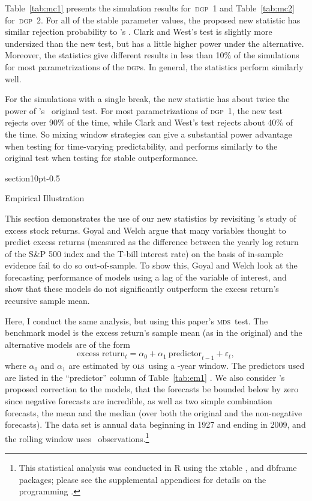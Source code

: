 \documentclass[11pt,fleqn]{article}
\makeatletter
\newcommand\citepos[2][]{\citeauthor{#2}'s \citeyearpar[#1]{#2}}
\newcommand\poscw{\citeauthor{ClW:06}'s \citeyearpar{ClW:06,ClW:07}}
\renewcommand\section{\@startsection%
{section}{1}{0pt}{-\baselineskip}{0.5\baselineskip}%
{\normalfont\normalsize\bfseries\large\raggedright}}
\theoremstyle{definition}
\newcommand{\dgp}{\textsc{dgp}}
\newcommand{\mds}{\textsc{mds}}
\newcommand{\ols}{\textsc{ols}}
\makeatother
\begin{document}
Table~\ref{tab:mc1} presents the simulation results for~\textsc{dgp}~1
and Table~\ref{tab:mc2} for~\textsc{dgp}~2.  For all of the stable
parameter values, the proposed new statistic has similar rejection
probability to \citepos{ClW:07}.  Clark and West's test is slightly
more undersized than the new test, but has a little higher power under
the alternative.  Moreover, the statistics give different results in
less than 10\% of the simulations for most parametrizations of the
\dgp s.  In general, the statistics perform similarly well.

For the simulations with a single break, the new statistic has about
twice the power of \poscw\ original test.  For most parametrizations
of \dgp\ 1, the new test rejects over 90\% of the time, while Clark
and West's test rejects about 40\% of the time.  So mixing window
strategies can give a substantial power advantage when testing for
time-varying predictability, and performs similarly to the original
test when testing for stable outperformance.

\section{Empirical Illustration}\label{sec:3}

This section demonstrates the use of our new statistics by revisiting
\citepos{GoW:08} study of excess stock returns.  Goyal and Welch argue
that many variables thought to predict excess returns (measured as the
difference between the yearly log return of the S\&P 500 index and the
T-bill interest rate) on the basis of in-sample evidence fail to do so
out-of-sample.  To show this, Goyal and Welch look at the forecasting
performance of models using a lag of the variable of interest, and
show that these models do not significantly outperform the excess
return's recursive sample mean.

Here, I conduct the same analysis, but using this paper's \mds\ test.
The benchmark model is the excess return's sample mean (as in the
original) and the alternative models are of the form
\[\text{excess return}_{t} = \alpha_{0} + \alpha_{1}\ 
\text{predictor}_{t-1} + \varepsilon_{t},\] where $\alpha_{0}$ and
$\alpha_{1}$ are estimated by \ols\ using a \windowlength-year window.
The predictors used are listed in the ``predictor'' column of
Table~\ref{tab:em1} \citep[see][for a detailed description of the
variables]{GoW:08}.  We also consider \citepos{CaT:08} proposed
correction to the models, that the forecasts be bounded below by zero
since negative forecasts are incredible, as well as two simple
combination forecasts, the mean and the median (over both the original
and the non-negative forecasts).  The data set is annual data
beginning in 1927 and ending in 2009, and the rolling window uses
\windowlength\ observations.\footnote{This statistical analysis was
  conducted in R \citep{R} using the xtable
  \citep[version~1.6-0]{Dah:09}, and dbframe \citep[version
  0.2.5]{Cal:10b} packages; please see the supplemental appendices for
  details on the programming \citep{Cal:11f}.}
\end{document}
